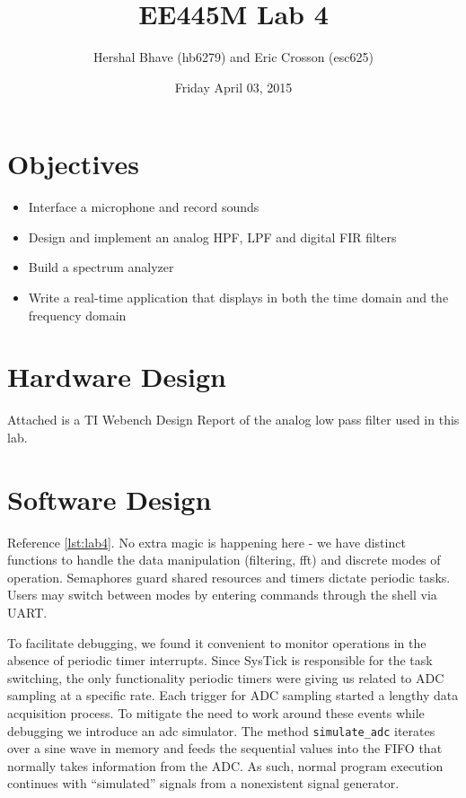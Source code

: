 \documentclass[12pt]{article}
\title{EE445M Lab 4}
\author{Hershal Bhave (hb6279) and Eric Crosson (esc625)}
\date{Friday April 03, 2015}
\begin{document}
\maketitle

\section{Objectives}
\begin{itemize}
  \item Interface a microphone and record sounds
  \item Design and implement an analog HPF, LPF and digital FIR filters
  \item Build a spectrum analyzer
  \item Write a real-time application that displays in both the time domain and the frequency domain
\end{itemize}

\section{Hardware Design}
Attached is a TI Webench Design Report of the analog low pass filter
used in this lab.


\section{Software Design}
Reference \cref{lst:lab4}. No extra magic is happening here - we have
distinct functions to handle the data manipulation (filtering, fft)
and discrete modes of operation. Semaphores guard shared resources and
timers dictate periodic tasks. Users may switch between
modes by entering commands through the shell via UART.

To facilitate debugging, we found it convenient to monitor operations
in the absence of periodic timer interrupts. Since SysTick is
responsible for the task switching, the only functionality periodic
timers were giving us related to ADC sampling at a specific rate. Each
trigger for ADC sampling started a lengthy data acquisition
process. To mitigate the need to work around these events while
debugging we introduce an adc simulator. The method
\verb|simulate_adc| iterates over a sine wave in memory and feeds the
sequential values into the FIFO that normally takes information from
the ADC. As such, normal program execution continues with
``simulated'' signals from a nonexistent signal generator.
\end{document}
